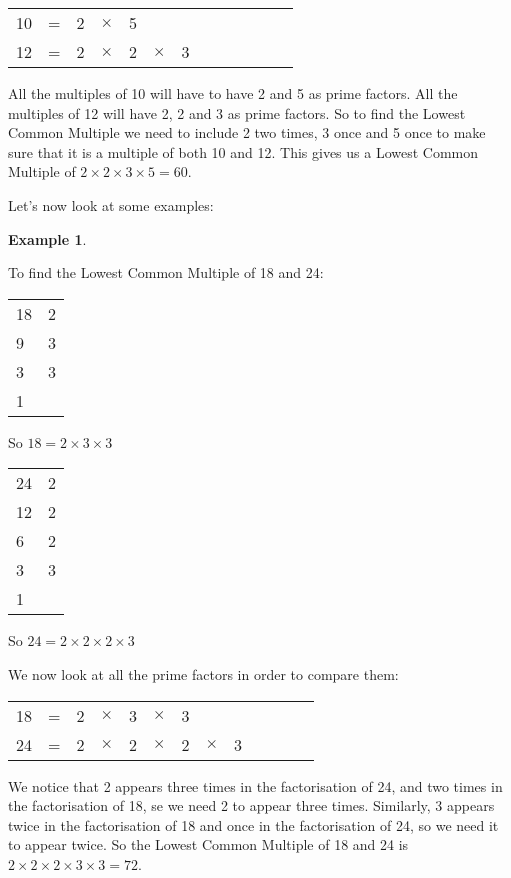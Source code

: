 \documentclass[11pt, oneside]{article}
\theoremstyle{definition}
\newtheorem{exmp}{Example}[section]
\begin{document}
\begin{tabular}{c c c c c c c c c c c c c}
10 & = & 2 & $\times$ & 5 &  &  &  &  &  &  &  &  \\
12 & = & 2 & $\times$ & 2 & $\times$ & 3 &  &  &  &  &  & 
\end{tabular}

All the multiples of 10 will have to have 2 and 5 as prime factors. All the multiples of 12 will have 2, 2 and 3 as prime factors. So to find the Lowest Common Multiple we need to include 2 two times, 3 once and 5 once to make sure that it is a multiple of both 10 and 12. This gives us a Lowest Common Multiple of $2\times 2 \times 3 \times 5 = 60$.

Let's now look at some examples:

\begin{exmp} \end{exmp}
To find the Lowest Common Multiple of 18 and 24:

\begin{tabular}{ p{0.5cm} | p{1.5cm}}
18 & 2  \\
9 & 3  \\
3 & 3  \\
1 &  
\end{tabular}

So $18 = 2 \times 3 \times 3$

\bigbreak

\begin{tabular}{ p{0.5cm} | p{1.5cm}}
24 & 2  \\
12 & 2  \\
6 & 2  \\
3 & 3  \\
1 
\end{tabular}

So $24 = 2\times 2 \times 2 \times 3$

We now look at all the prime factors in order to compare them:

\begin{tabular}{c c c c c c c c c c c c c}
18 & = & 2 & $\times$ & 3 & $\times$ & 3 &  &  &  &  &  &  \\
24 & = & 2 & $\times$ & 2 & $\times$ & 2 & $\times$ & 3 &  &  &  & 
\end{tabular}

We notice that 2 appears three times in the factorisation of 24, and two times in the factorisation of 18, se we need 2 to appear three times. Similarly, 3 appears twice in the factorisation of 18 and once in the factorisation of 24, so we need it to appear twice. So the Lowest Common Multiple of 18 and 24 is $2\times 2 \times 2 \times 3 \times 3 = 72$.
\end{document}
